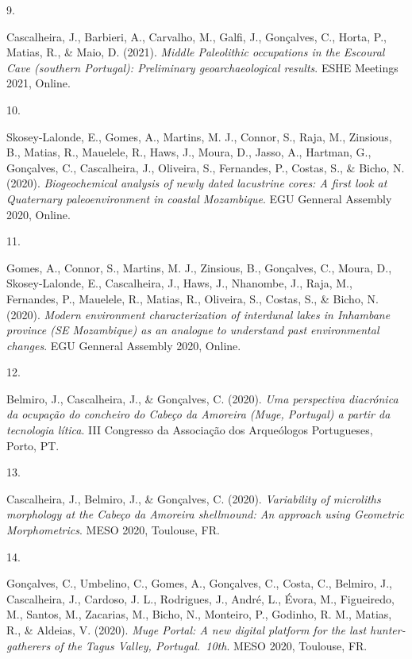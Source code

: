 \documentclass[11pt,a4paper,]{awesome-cv}
\newlength{\cslhangindent}
\newlength{\csllabelwidth}
\newenvironment{CSLReferences}[2] %
 {\begin{list}{}{%
  \setlength{\itemindent}{0pt}
  \setlength{\leftmargin}{0pt}
  \setlength{\parsep}{0pt}
  \ifodd #1
   \setlength{\leftmargin}{\cslhangindent}
   \setlength{\itemindent}{-1\cslhangindent}
  \fi
  \setlength{\itemsep}{#2\baselineskip}}}
 {\end{list}}
\newcommand{\CSLLeftMargin}[1]{\parbox[t]{\csllabelwidth}{\strut#1\strut}}
\newcommand{\CSLRightInline}[1]{\parbox[t]{\linewidth - \csllabelwidth}{\strut#1\strut}}
\begin{document}
\begin{CSLReferences}{0}{0}
\CSLLeftMargin{9. }%
\CSLRightInline{Cascalheira, J., Barbieri, A., Carvalho, M., Galfi, J.,
Gonçalves, C., Horta, P., Matias, R., \& Maio, D. (2021). \emph{Middle
Paleolithic occupations in the Escoural Cave (southern Portugal):
Preliminary geoarchaeological results}. ESHE Meetings 2021, Online.}

\CSLLeftMargin{10. }%
\CSLRightInline{Skosey-Lalonde, E., Gomes, A., Martins, M. J., Connor,
S., Raja, M., Zinsious, B., Matias, R., Mauelele, R., Haws, J., Moura,
D., Jasso, A., Hartman, G., Gonçalves, C., Cascalheira, J., Oliveira,
S., Fernandes, P., Costas, S., \& Bicho, N. (2020). \emph{Biogeochemical
analysis of newly dated lacustrine cores: A first look at Quaternary
paleoenvironment in coastal Mozambique}. EGU Genneral Assembly 2020,
Online.}

\CSLLeftMargin{11. }%
\CSLRightInline{Gomes, A., Connor, S., Martins, M. J., Zinsious, B.,
Gonçalves, C., Moura, D., Skosey-Lalonde, E., Cascalheira, J., Haws, J.,
Nhanombe, J., Raja, M., Fernandes, P., Mauelele, R., Matias, R.,
Oliveira, S., Costas, S., \& Bicho, N. (2020). \emph{Modern environment
characterization of interdunal lakes in Inhambane province (SE
Mozambique) as an analogue to understand past environmental changes}.
EGU Genneral Assembly 2020, Online.}

\CSLLeftMargin{12. }%
\CSLRightInline{Belmiro, J., Cascalheira, J., \& Gonçalves, C. (2020).
\emph{Uma perspectiva diacrónica da ocupação do concheiro do Cabeço da
Amoreira (Muge, Portugal) a partir da tecnologia lítica}. III Congresso
da Associação dos Arqueólogos Portugueses, Porto, PT.}

\CSLLeftMargin{13. }%
\CSLRightInline{Cascalheira, J., Belmiro, J., \& Gonçalves, C. (2020).
\emph{Variability of microliths morphology at the Cabeço da Amoreira
shellmound: An approach using Geometric Morphometrics}. MESO 2020,
Toulouse, FR.}

\CSLLeftMargin{14. }%
\CSLRightInline{Gonçalves, C., Umbelino, C., Gomes, A., Gonçalves, C.,
Costa, C., Belmiro, J., Cascalheira, J., Cardoso, J. L., Rodrigues, J.,
André, L., Évora, M., Figueiredo, M., Santos, M., Zacarias, M., Bicho,
N., Monteiro, P., Godinho, R. M., Matias, R., \& Aldeias, V. (2020).
\emph{Muge Portal: A new digital platform for the last hunter-gatherers
of the Tagus Valley, Portugal.~10th}. MESO 2020, Toulouse, FR.}


\end{CSLReferences}
\end{document}
